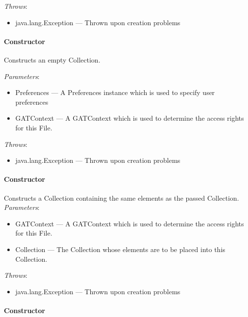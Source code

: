 \documentclass[$Date: 2003/06/26 19:29:31 $]{glabarticle}
\begin{document}
 \textit{Throws}:
 \begin{itemize}
 \item[] java.lang.Exception --- Thrown upon creation problems 
 \end{itemize}

\paragraph{Constructor}

Constructs an empty Collection.

\textit{Parameters}:
\begin{itemize}
\item[] Preferences --- A Preferences instance which is used to specify user preferences
\item[] GATContext --- A GATContext which is used to determine the access rights for this File.
\end{itemize}

 \textit{Throws}:
 \begin{itemize}
 \item[] java.lang.Exception --- Thrown upon creation problems 
 \end{itemize}
 
\paragraph{Constructor}

Constructs a Collection containing the same elements as the passed
Collection.\\

\textit{Parameters}:
\begin{itemize}
\item[] GATContext --- A GATContext which is used to determine the access rights for this File.
\item[] Collection ---  The Collection whose elements are to be placed into this Collection.
\end{itemize}

 \textit{Throws}:
 \begin{itemize}
 \item[] java.lang.Exception --- Thrown upon creation problems 
 \end{itemize}
 
 \paragraph{Constructor}
\end{document}
